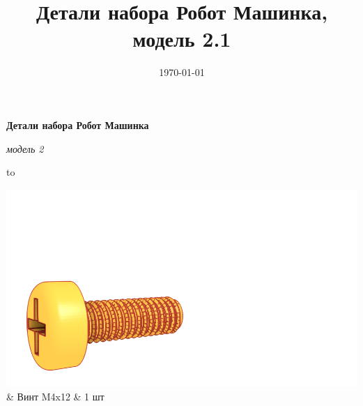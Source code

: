 \documentclass[twoside,a5paper,8pt]{article}
\title{Детали набора Робот Машинка, модель 2.1} %
\date{\today} %
\newlength{\picwidth}
\begin{document}
  \begin{center}
    \textbf{Детали набора Робот Машинка}
  \end{center}
  \begin{flushright}
    \emph{модель 2}
  \end{flushright}
  
   
  \begin{longtabu} to 

\includegraphics[width=\picwidth]{fig/screws/crosshead-screw-m4x12-orange.png} & Винт M4x12 & 1 шт \\


\end{longtabu}
\end{document}
